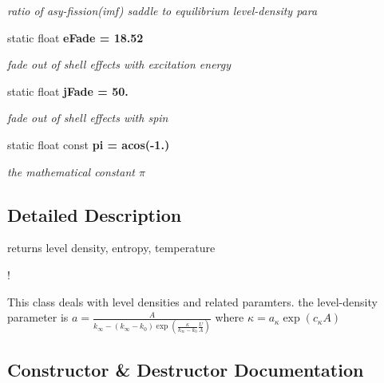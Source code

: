 \begin{CompactItemize}
\begin{CompactList}\small\item\em ratio of asy-fission(imf) saddle to equilibrium level-density para \item\end{CompactList}\item 
static float \bf{e\-Fade} = 18.52\label{classCLevelDensity_cc813690a415d62c977ee7d6d9125f90}

\begin{CompactList}\small\item\em fade out of shell effects with excitation energy \item\end{CompactList}\item 
static float \bf{j\-Fade} = 50.\label{classCLevelDensity_9b2cb43c005e88d8fbedd5853e9960e5}

\begin{CompactList}\small\item\em fade out of shell effects with spin \item\end{CompactList}\item 
static float const \bf{pi} = acos(-1.)\label{classCLevelDensity_2a8c4bc82f1676360d9a68e33ab82067}

\begin{CompactList}\small\item\em the mathematical constant $\pi$ \item\end{CompactList}\end{CompactItemize}


\subsection{Detailed Description}
returns level density, entropy, temperature 

!

This class deals with level densities and related paramters. the level-density parameter is $a=\frac{A}{k_{\infty} - \left(k_{\infty} -k_{0} \right) \exp\left( \frac{\kappa}{k_{\infty}-k_{0}}\frac{U}{A}\right)}$ where $ \kappa = a_{\kappa} \exp\left(c_{\kappa} A\right) $ 



\subsection{Constructor \& Destructor Documentation}
